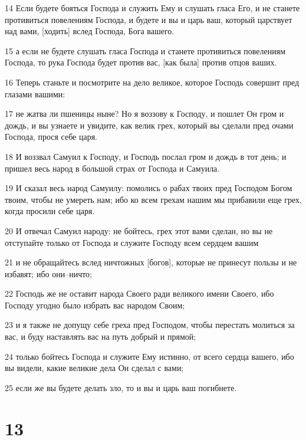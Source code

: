 \par 14 Если будете бояться Господа и служить Ему и слушать гласа Его, и не станете противиться повелениям Господа, и будете и вы и царь ваш, который царствует над вами, [ходить] вслед Господа, Бога вашего.
\par 15 а если не будете слушать гласа Господа и станете противиться повелениям Господа, то рука Господа будет против вас, [как была] против отцов ваших.
\par 16 Теперь станьте и посмотрите на дело великое, которое Господь совершит пред глазами вашими:
\par 17 не жатва ли пшеницы ныне? Но я воззову к Господу, и пошлет Он гром и дождь, и вы узнаете и увидите, как велик грех, который вы сделали пред очами Господа, прося себе царя.
\par 18 И воззвал Самуил к Господу, и Господь послал гром и дождь в тот день; и пришел весь народ в большой страх от Господа и Самуила.
\par 19 И сказал весь народ Самуилу: помолись о рабах твоих пред Господом Богом твоим, чтобы не умереть нам; ибо ко всем грехам нашим мы прибавили еще грех, когда просили себе царя.
\par 20 И отвечал Самуил народу: не бойтесь, грех этот вами сделан, но вы не отступайте только от Господа и служите Господу всем сердцем вашим
\par 21 и не обращайтесь вслед ничтожных [богов], которые не принесут пользы и не избавят; ибо они--ничто;
\par 22 Господь же не оставит народа Своего ради великого имени Своего, ибо Господу угодно было избрать вас народом Своим;
\par 23 и я также не допущу себе греха пред Господом, чтобы перестать молиться за вас, и буду наставлять вас на путь добрый и прямой;
\par 24 только бойтесь Господа и служите Ему истинно, от всего сердца вашего, ибо вы видели, какие великие дела Он сделал с вами;
\par 25 если же вы будете делать зло, то и вы и царь ваш погибнете.

\chapter{13}

